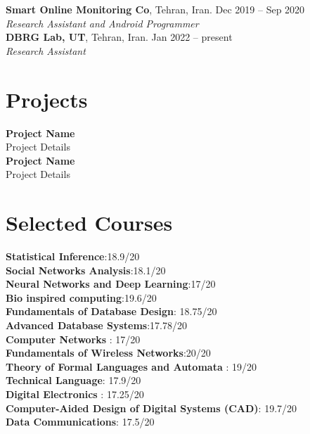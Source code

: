 \documentclass[margin,line]{res}
\begin{document}
\begin{resume}
{\bf Smart Online Monitoring Co}, Tehran, Iran. \hfill{Dec 2019 -- Sep 2020}\\
{\em Research Assistant and Android Programmer  }\\

{\bf DBRG Lab, UT}, Tehran, Iran. \hfill{Jan 2022 -- present}\\
{\em Research Assistant  }\\
\section{\sc Projects}
{\bf Project Name}\\
Project Details\\
	
{\bf Project Name}\\
Project Details\\

\section{\sc Selected Courses}
{\bf Statistical Inference}:18.9/20\\
{\bf Social Networks Analysis}:18.1/20\\
{\bf Neural Networks and Deep Learning}:17/20\\
{\bf Bio inspired computing}:19.6/20\\
{\bf Fundamentals of Database Design}: 18.75/20\\
{\bf Advanced Database Systems}:17.78/20\\
{\bf Computer Networks} :‌ 17/20\\
{\bf Fundamentals of Wireless Networks}:20/20\\
{\bf Theory of Formal Languages and Automata} :‌ 19/20\\
{\bf Technical Language}: 17.9/20\\
{\bf Digital Electronics} :‌ 17.25/20\\
{\bf Computer-Aided Design of Digital Systems (CAD)}: 19.7/20\\
{\bf Data Communications}: 17.5/20\\






\end{resume}
\end{document}

